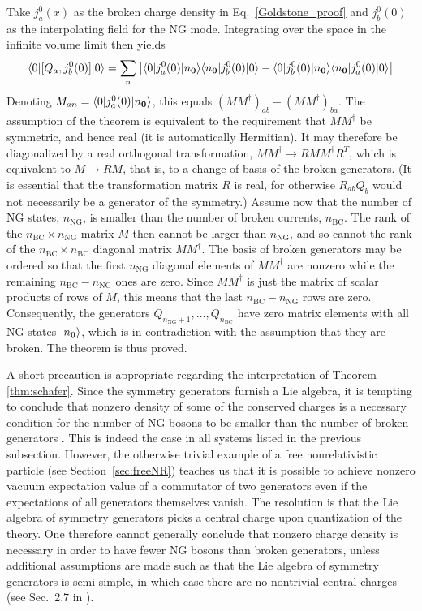 \documentclass[final,3p,times,12pt,a4paper,sort&compress]{elsarticle}
\newcommand\vek[1]{{\boldsymbol{\bf #1}}}   %
\newcommand\bra[1]{\langle#1\vert}          %
\newcommand\ket[1]{\vert#1\rangle}          %
\newcommand\he[1]{#1^{\dagger}}             %
\begin{document}
Take $j^0_a(x)$ as the broken charge density in Eq.~\eqref{Goldstone_proof} and
$j^0_b(0)$ as the interpolating field for the NG mode. Integrating over the
space in the infinite volume limit then yields
\begin{equation}
\bra0[Q_a,j^0_b(0)]\ket0=\sum_n\left[
\bra0j^0_a(0)\ket{n_{\vek0}}\bra{n_{\vek0}}j^0_b(0)\ket0-
\bra0j^0_b(0)\ket{n_{\vek0}}\bra{n_{\vek0}}j^0_a(0)\ket0
\right]
\label{currentOP}
\end{equation}
Denoting $M_{an}=\bra0j^0_a(0)\ket{n_{\vek0}}$, this equals $(M\he M)_{ab}-(M\he
M)_{ba}$. The assumption of the theorem is equivalent to the requirement that
$M\he M$ be symmetric, and hence real (it is automatically Hermitian). It may
therefore be diagonalized by a real orthogonal transformation, $M\he M\to RM\he
MR^T$, which is equivalent to $M\to RM$, that is, to a change of basis of the
broken generators. (It is essential that the transformation matrix $R$ is real,
for otherwise $R_{ab}Q_b$ would not necessarily be a generator of the symmetry.)
Assume now that the number of NG states, $n_{\text{NG}}$, is smaller than the
number of broken currents, $n_{\text{BC}}$. The rank of the
$n_{\text{BC}}\times n_{\text{NG}}$ matrix $M$ then cannot be larger than
$n_{\text{NG}}$, and so cannot the rank of the $n_{\text{BC}}\times
n_{\text{BC}}$ diagonal matrix $M\he M$. The basis of broken generators may be
ordered so that the first $n_{\text{NG}}$ diagonal elements of $M\he M$ are
nonzero while the remaining $n_{\text{BC}}-n_{\text{NG}}$ ones are zero. Since
$M\he M$ is just the matrix of scalar products of rows of $M$, this means that
the last $n_{\text{BC}}-n_{\text{NG}}$ rows are zero. Consequently, the
generators $Q_{n_{\text{NG}}+1},\dotsc, Q_{n_{\text{BC}}}$ have zero matrix
elements with all NG states $\ket{n_{\vek0}}$, which is in contradiction with
the assumption that they are broken. The theorem is thus proved.

A short precaution is appropriate regarding the interpretation of Theorem
\ref{thm:schafer}. Since the symmetry generators furnish a Lie algebra, it is
tempting to conclude that nonzero density of some of the conserved charges is a
necessary condition for the number of NG bosons to be smaller than the number
of broken generators \cite{Schafer:2001bq,Brauner:2005di}. This is indeed the
case in all systems listed in the previous subsection. However, the
otherwise trivial example of a free nonrelativistic particle (see
Section~\ref{sec:freeNR}) teaches us that it is possible to achieve nonzero
vacuum expectation value of a commutator of two generators even if the
expectations of all generators themselves vanish. The resolution is that the Lie
algebra of symmetry generators picks a central charge upon quantization of the
theory. One therefore cannot generally conclude that nonzero charge density is
necessary in order to have fewer NG bosons than broken generators, unless
additional assumptions are made such as that the Lie algebra of symmetry
generators is semi-simple, in which case there are no nontrivial central charges
(see Sec.~2.7 in \cite{Weinberg:1995v1}).
\end{document}
